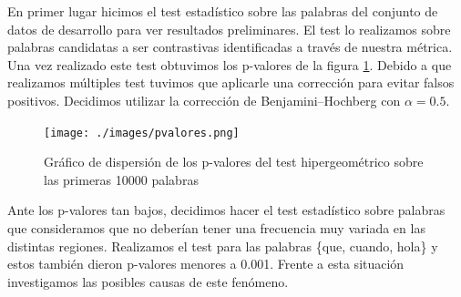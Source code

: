 En primer lugar hicimos el test estadístico sobre las palabras del conjunto de datos de desarrollo para ver resultados preliminares. El test lo realizamos sobre palabras candidatas a ser contrastivas identificadas a través de nuestra métrica. Una vez realizado este test obtuvimos los p-valores de la figura \ref{fig:p-valores}. Debido a que realizamos múltiples test tuvimos que aplicarle una corrección para evitar falsos positivos. Decidimos utilizar la corrección de Benjamini–Hochberg \cite{benjamini1995controlling} con $\alpha = 0.5$.


\begin{figure}[!ht]\centering
    \texttt{[image: ./images/pvalores.png]}
    \caption{Gráfico de dispersión de los p-valores del test hipergeométrico sobre las primeras 10000 palabras} 
    \label{fig:p-valores}   
\end{figure}


Ante los p-valores tan bajos, decidimos hacer el test estadístico sobre palabras que consideramos que no deberían tener una frecuencia muy variada en las distintas regiones. Realizamos el test para las palabras \{que, cuando, hola\} y estos también dieron p-valores menores a 0.001. Frente a esta situación investigamos las posibles causas de este fenómeno.


